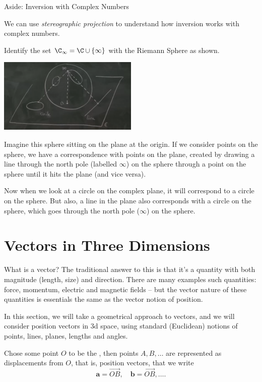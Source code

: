 \documentclass[a4]{scrreprt}
\begin{document}
\begin{aside}{Aside: Inversion with Complex Numbers}

We can use \emph{stereographic projection} to understand how inversion works with complex numbers.

Identify the set $\C_\infty = \C \cup \{\infty\}$ with the Riemann Sphere as shown.
\begin{center}
	\includegraphics[width=0.5\textwidth]{riemann_sphere.png}
\end{center}
Imagine this sphere sitting on the plane at the origin. If we consider points on the sphere, we have a correspondence with points on the plane, created by drawing a line through the north pole (labelled $\infty$) on the sphere through a point on the sphere until it hits the plane (and vice versa). 

Now when we look at a circle on the complex plane, it will correspond to a circle on the sphere. But also, a line in the plane also corresponds with a circle on the sphere, which goes through the north pole ($\infty$) on the sphere.

\end{aside}

\clearpage
\chapter{Vectors in Three Dimensions}

What is a vector? The traditional answer to this is that it's a quantity with both magnitude (length, size) and direction.
There are many examples such quantities: force, momentum, electric and magnetic fields -- but the vector nature of these quantities is essentials the same as the vector notion of position.

In this section, we will take a geometrical approach to vectors, and we will consider position vectors in 3d space, using standard (Euclidean) notions of points, lines, planes, lengths and angles.

Chose some point $O$ to be the , then points $A, B, \dots$ are represented as displacements from $O$, that is, position vectors, that we write
$$
\mathbf{a} = \overrightarrow{OB}, \quad \mathbf{b} = \overrightarrow{OB}, \dots.
$$
\end{document}
